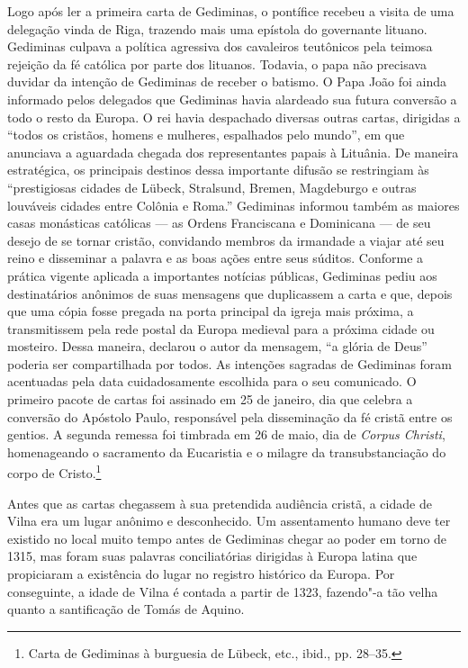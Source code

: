 Logo após ler a primeira carta de Gediminas, o pontífice recebeu a
visita de uma delegação vinda de Riga, trazendo mais uma epístola do
governante lituano. Gediminas culpava a política agressiva dos
cavaleiros teutônicos pela teimosa rejeição da fé católica por parte dos
lituanos. Todavia, o papa não precisava duvidar da intenção de Gediminas
de receber o batismo. O Papa João  foi ainda informado pelos
delegados que Gediminas havia alardeado sua futura conversão a todo o
resto da Europa. O rei havia despachado diversas outras cartas,
dirigidas a ``todos os cristãos, homens e mulheres, espalhados pelo
mundo'', em que anunciava a aguardada chegada dos representantes papais
à Lituânia. De maneira estratégica, os principais destinos dessa
importante difusão se restringiam às ``prestigiosas cidades de Lübeck,
Stralsund, Bremen, Magdeburgo e outras louváveis cidades entre Colônia e
Roma.'' Gediminas informou também as maiores casas monásticas católicas
--- as Ordens Franciscana e Dominicana --- de seu desejo de se tornar
cristão, convidando membros da irmandade a viajar até seu reino e
disseminar a palavra e as boas ações entre seus súditos. Conforme a
prática vigente aplicada a importantes notícias públicas, Gediminas
pediu aos destinatários anônimos de suas mensagens que duplicassem a
carta e que, depois que uma cópia fosse pregada na porta principal da
igreja mais próxima, a transmitissem pela rede postal da Europa medieval
para a próxima cidade ou mosteiro. Dessa maneira, declarou o autor da
mensagem, ``a glória de Deus'' poderia ser compartilhada por todos. As
intenções sagradas de Gediminas foram acentuadas pela data
cuidadosamente escolhida para o seu comunicado. O primeiro pacote de
cartas foi assinado em 25 de janeiro, dia que celebra a conversão do
Apóstolo Paulo, responsável pela disseminação da fé cristã entre os
gentios. A segunda remessa foi timbrada em 26 de maio, dia de
\emph{Corpus Christi}, homenageando o sacramento da Eucaristia e o
milagre da transubstanciação do corpo de Cristo.\footnote{Carta de
  Gediminas à burguesia de Lübeck, etc., ibid., pp. 28--35.}

Antes que as cartas chegassem à sua pretendida audiência cristã, a
cidade de Vilna era um lugar anônimo e desconhecido. Um assentamento
humano deve ter existido no local muito tempo antes de Gediminas chegar
ao poder em torno de 1315, mas foram suas palavras conciliatórias
dirigidas à Europa latina que propiciaram a existência do lugar no
registro histórico da Europa. Por conseguinte, a idade de Vilna é
contada a partir de 1323, fazendo"-a tão velha quanto a santificação de
Tomás de Aquino.

